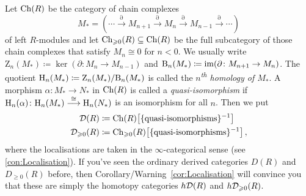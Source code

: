 \begin{numpar}\label{con:DerivedCategoryI}%
	Let $\operatorname{Ch}(R)$ be the category of chain complexes
	\begin{equation*}
		M_*=\left(\dotsb \overset{\partial}{\longrightarrow} M_{n+1}\overset{\partial}{\longrightarrow} M_n\overset{\partial}{\longrightarrow} M_{n-1}\overset{\partial}{\longrightarrow}\dotsb\right)
	\end{equation*}
	of left $R$-modules and let $\operatorname{Ch}_{\geqslant 0}(R)\subseteq \operatorname{Ch}(R)$ be the full subcategory of those chain complexes that satisfy $M_n\cong 0$ for $n<0$. We usually write $\mathrm Z_n(M_*)\coloneqq \ker(\partial\colon M_n\rightarrow M_{n-1})$ and $\mathrm B_n(M_*)\coloneqq \operatorname{im}(\partial\colon M_{n+1}\rightarrow M_n)$. The quotient $\mathrm{H}_n(M_*)\coloneqq \mathrm Z_n(M_*)/\mathrm B_n(M_*)$ is called the \emph{$n$\textsuperscript{th} homology of $M_*$}. A morphism $\alpha\colon M_*\rightarrow N_*$ in $\operatorname{Ch}(R)$ is called a \emph{quasi-isomorphism} if $\mathrm{H}_n(\alpha)\colon \mathrm{H}_n(M_*)\overset{\cong}{\longrightarrow} \mathrm{H}_n(N_*)$ is an isomorphism for all $n$. Then we put
	\begin{align*}
		\Dd(R)&\coloneqq \Ch(R)\left[\{\text{quasi-isomorphisms}\}^{-1}\right]\\
		\Dd_{\geqslant 0}(R)&\coloneqq \Ch_{\geqslant 0}(R)\left[\{\text{quasi-isomorphisms}\}^{-1}\right]\,,
	\end{align*}
	where the localisations are taken in the $\infty$-categorical sense (see \cref{con:Localisation}). If you've seen the ordinary derived categories $D(R)$ and $D_{\geqslant 0}(R)$ before, then Corollary/Warning~\cref{cor:Localisation} will convince you that these are simply the homotopy categories $h\mathcal{D}(R)$ and $h\mathcal{D}_{\geqslant 0}(R)$.
	

\end{numpar}
